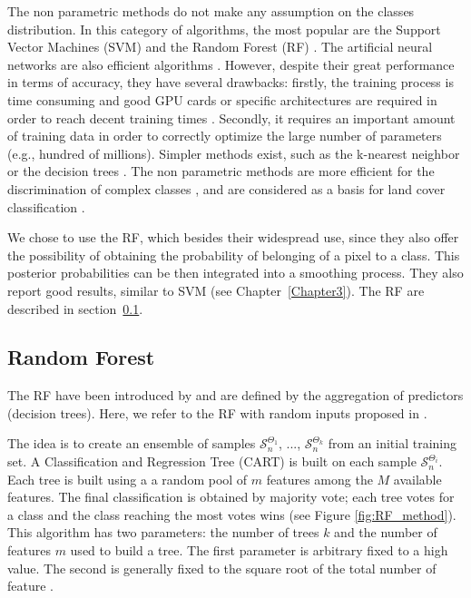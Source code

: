 The non parametric methods do not make any assumption on the classes distribution. In this category of algorithms, the most popular are the Support Vector Machines (SVM) \citep{boser1992training, scholkopf2001learning} and the Random Forest (RF) \citep{breiman2001random}. The artificial neural networks are also efficient algorithms \citep{hepner1990artificial, atkinson1997mapping}. However, despite their great performance in terms of accuracy, they have several drawbacks: firstly, the training process is time consuming and good GPU cards or specific architectures are required in order to reach decent training times \citep{dean2012large, moritz2015sparknet}. Secondly, it requires an important amount of training data in order to correctly optimize the large number of parameters (e.g., hundred of millions). Simpler methods exist, such as the k-nearest neighbor \citep{indyk1998approximate} or the decision trees \citep{breiman1984classification}. The non parametric methods are more efficient  for the discrimination of complex classes \citep{paola1995review, foody2002status}, and are considered as a basis for land cover classification \citep{camps2009kernel}.

We chose to use the RF, which besides their widespread use, since they also offer the possibility of obtaining the probability of belonging of a pixel to a class. This posterior probabilities can be then integrated into a smoothing process. They also report good results, similar to SVM (see Chapter~\ref{Chapter3}). The RF are described in section~\ref{sec:RF}.

\subsection{Random Forest}
\label{sec:RF}
The RF have been introduced by \cite{breiman2001random} and are defined by the aggregation of predictors (decision trees). Here, we refer to the RF with random inputs proposed in \cite{breiman2001random}.

The idea is to create an ensemble of samples $\mathcal{S}_{n}^{\Theta_{1}}$, ..., $\mathcal{S}_{n}^{\Theta_{k}}$ from an initial training set. A Classification and Regression Tree (CART) \citep{breiman1984classification} is built on each sample $\mathcal{S}_{n}^{\Theta_{i}}$. Each tree is built using a a random pool of $m$ features among the $M$ available features. The final classification is obtained by majority vote; each tree votes for a class and the class reaching the most votes wins (see Figure \ref{fig:RF_method}). This algorithm has two parameters: the number of trees $k$ and the number of features $m$ used to build a tree. The first parameter is arbitrary fixed to a high value. The second is generally fixed to the square root of the total number of feature \citep{gislason2006random}.

